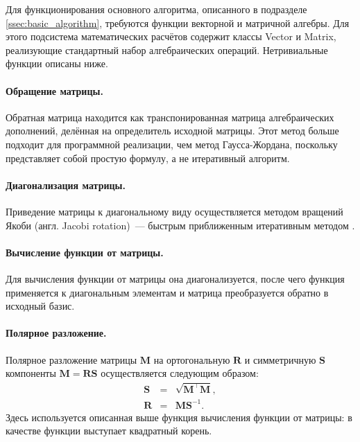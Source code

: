 \documentclass[a4paper, 14pt, titlepage]{extarticle}
\newcommand{\eng}[1]{{\English #1}}
\newcommand{\matx}[1]{\mathbf{#1}} %
\newcommand{\transposed}{\top} %
\begin{document}
        Для функционирования основного алгоритма, описанного в подразделе \ref{ssec:basic_algorithm}, требуются
        функции векторной и матричной алгебры. Для этого подсистема математических расчётов содержит
        классы Vector и Matrix, реализующие стандартный набор алгебраических операций. Нетривиальные
        функции описаны ниже.

        \paragraph{Обращение матрицы.}
        Обратная матрица находится как транспонированная матрица алгебраических дополнений, делённая
        на определитель исходной матрицы. Этот метод больше подходит для программной реализации, чем
        метод Гаусса-Жордана, поскольку представляет собой простую формулу, а не итеративный
        алгоритм.

        \paragraph{Диагонализация матрицы.}
        Приведение матрицы к диагональному виду осуществляется методом вращений Якоби (англ.
        \eng{Jacobi rotation})~--- быстрым приближенным итеративным методом \cite{fortran-jacobi}.

        \paragraph{Вычисление функции от матрицы.}
        Для вычисления функции от матрицы она диагонализуется, после чего функция применяется к
        диагональным элементам и матрица преобразуется обратно в исходный базис.

        \paragraph{Полярное разложение.}
        Полярное разложение матрицы $\matx M$ на ортогональную $\matx R$ и симметричную $\matx S$ компоненты
        $\matx M = \matx R \matx S$ осуществляется следующим образом:
        \begin{eqnarray*}
          \matx S & = & \sqrt{\matx{M}^\transposed \matx{M}},\\
          \matx R & = & \matx M \matx{S}^{-1}.
        \end{eqnarray*}
        Здесь используется описанная выше функция вычисления функции от матрицы: в качестве функции
        выступает квадратный корень.
\end{document}
